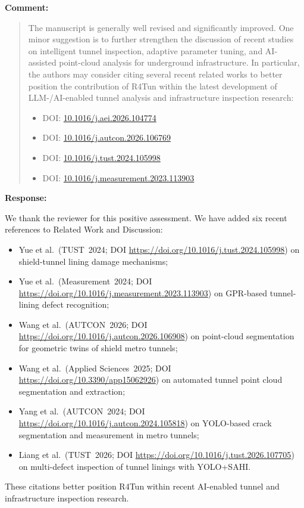 \documentclass[11pt,a4paper]{article}
\newenvironment{commentblock}{%
  \par\smallskip\noindent\textbf{Comment:}\par
  \begin{quote}\itshape\color{black}
}{%
  \end{quote}\smallskip
}
\newenvironment{responseblock}{%
  \par\smallskip\noindent\textbf{Response:}\par
  \begingroup\color{responsegreen}
}{%
  \endgroup\smallskip
}
\begin{document}
\begin{commentblock}
The manuscript is generally well revised and significantly improved. One minor suggestion is to further strengthen the discussion of recent studies on intelligent tunnel inspection, adaptive parameter tuning, and AI-assisted point-cloud analysis for underground infrastructure. In particular, the authors may consider citing several recent related works to better position the contribution of R4Tun within the latest development of LLM-/AI-enabled tunnel analysis and infrastructure inspection research:
\begin{itemize}[nosep]
  \item DOI: \url{10.1016/j.aei.2026.104774}
  \item DOI: \url{10.1016/j.autcon.2026.106769}
  \item DOI: \url{10.1016/j.tust.2024.105998}
  \item DOI: \url{10.1016/j.measurement.2023.113903}
\end{itemize}
\end{commentblock}
\begin{responseblock}
We thank the reviewer for this positive assessment. We have added six recent references to Related Work and Discussion:
\begin{itemize}[nosep]
  \item Yue et al.\ (TUST~2024; DOI \url{https://doi.org/10.1016/j.tust.2024.105998}) on shield-tunnel lining damage mechanisms;
  \item Yue et al.\ (Measurement~2024; DOI \url{https://doi.org/10.1016/j.measurement.2023.113903}) on GPR-based tunnel-lining defect recognition;
  \item Wang et al.\ (AUTCON~2026; DOI \url{https://doi.org/10.1016/j.autcon.2026.106908}) on point-cloud segmentation for geometric twins of shield metro tunnels;
  \item Wang et al.\ (Applied Sciences~2025; DOI \url{https://doi.org/10.3390/app15062926}) on automated tunnel point cloud segmentation and extraction;
  \item Yang et al.\ (AUTCON~2024; DOI \url{https://doi.org/10.1016/j.autcon.2024.105818}) on YOLO-based crack segmentation and measurement in metro tunnels;
  \item Liang et al.\ (TUST~2026; DOI \url{https://doi.org/10.1016/j.tust.2026.107705}) on multi-defect inspection of tunnel linings with YOLO+SAHI.
\end{itemize}
These citations better position R4Tun within recent AI-enabled tunnel and infrastructure inspection research.
\end{responseblock}
\end{document}
